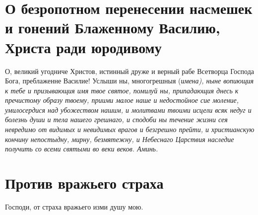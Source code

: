 \section{О безропотном перенесении насмешек и гонений Блаженному Василию, Христа ради юродивому}\begin{mymulticols}
 

О, великий угодниче Христов, истинный друже и верный рабе Всетворца Господа Бога, преблаженне Василие! Услыши ны, многогрешныя (\itshape имена\normalfont{}), ныне вопиющия к тебе и призывающия имя твое святое, помилуй ны, припадающия днесь к пречистому образу твоему, приими малое наше и недостойное сие моление, умилосердися над убожеством нашим, и молитвами твоими исцели всяк недуг и болезнь души и тела нашего грешнаго, и сподоби ны течение жизни сея невредимо от видимых и невидимых врагов и безгрешно прейти, и христианскую кончину непостыдну, мирну, безмятежну, и Небеснаго Царствия наследие получить со всеми святыми во веки веков. Аминь.

\end{mymulticols}

\section{Против вражьего страха}
 

Господи, от страха вражьего изми душу мою. 

\mychapterending


 

